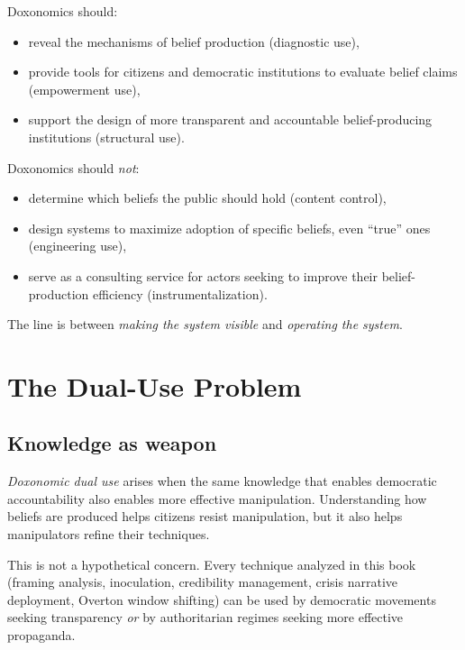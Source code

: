 \begin{principle}
\label{prin:anti-technocracy}
Doxonomics should:
\begin{itemize}[nosep]
  \item reveal the mechanisms of belief production (diagnostic use),
  \item provide tools for citizens and democratic institutions to evaluate belief claims (empowerment use),
  \item support the design of more transparent and accountable belief-producing institutions (structural use).
\end{itemize}
Doxonomics should \emph{not}:
\begin{itemize}[nosep]
  \item determine which beliefs the public should hold (content control),
  \item design systems to maximize adoption of specific beliefs, even ``true'' ones (engineering use),
  \item serve as a consulting service for actors seeking to improve their belief-production efficiency (instrumentalization).
\end{itemize}
The line is between \emph{making the system visible} and \emph{operating the system}.
\end{principle}

\section{The Dual-Use Problem}
\label{sec:ch34-dual-use}

\subsection{Knowledge as weapon}

\begin{definition}
\label{def:dual-use}
\emph{Doxonomic dual use} arises when the same knowledge that enables democratic accountability also enables more effective manipulation.
Understanding how beliefs are produced helps citizens resist manipulation, but it also helps manipulators refine their techniques.
\end{definition}

This is not a hypothetical concern.
Every technique analyzed in this book (framing analysis, inoculation, credibility management, crisis narrative deployment, Overton window shifting) can be used by democratic movements seeking transparency \emph{or} by authoritarian regimes seeking more effective propaganda.

